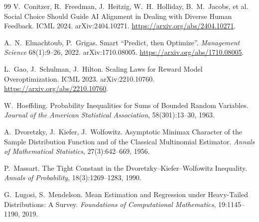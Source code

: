 \documentclass[11pt]{article}
\theoremstyle{plain}
\theoremstyle{definition}
\theoremstyle{remark}
\begin{document}
\begin{thebibliography}{99}
V.~Conitzer, R.~Freedman, J.~Heitzig, W.~H.~Holliday, B.~M.~Jacobs, et al.
\newblock Social Choice Should Guide AI Alignment in Dealing with Diverse Human Feedback.
\newblock ICML 2024. arXiv:2404.10271. \url{https://arxiv.org/abs/2404.10271}.

A.~N.~Elmachtoub, P.~Grigas.
\newblock Smart ``Predict, then Optimize''.
\newblock \emph{Management Science} 68(1):9--26, 2022. arXiv:1710.08005. \url{https://arxiv.org/abs/1710.08005}.

L.~Gao, J.~Schulman, J.~Hilton.
\newblock Scaling Laws for Reward Model Overoptimization.
\newblock ICML 2023. arXiv:2210.10760. \url{https://arxiv.org/abs/2210.10760}.

W.~Hoeffding.
\newblock Probability Inequalities for Sums of Bounded Random Variables.
\newblock \emph{Journal of the American Statistical Association}, 58(301):13--30, 1963.

A.~Dvoretzky, J.~Kiefer, J.~Wolfowitz.
\newblock Asymptotic Minimax Character of the Sample Distribution Function and of the Classical
Multinomial Estimator.
\newblock \emph{Annals of Mathematical Statistics}, 27(3):642--669, 1956.

P.~Massart.
\newblock The Tight Constant in the Dvoretzky--Kiefer--Wolfowitz Inequality.
\newblock \emph{Annals of Probability}, 18(3):1269--1283, 1990.

G.~Lugosi, S.~Mendelson.
\newblock Mean Estimation and Regression under Heavy-Tailed Distributions: A Survey.
\newblock \emph{Foundations of Computational Mathematics}, 19:1145--1190, 2019.

\end{thebibliography}
\end{document}
